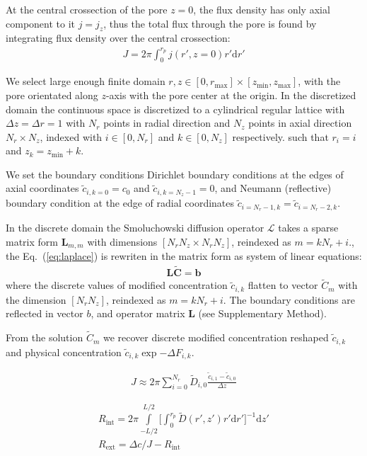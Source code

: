 \documentclass[12pt, a4paper]{article}
\begin{document}
At the central crossection of the pore $z=0$, the flux density has only axial component to it $j=j_z$, thus the total flux through the pore is found by integrating flux density over the central crossection:
\begin{eqnarray}
    J = 2\pi\int_{0}^{r_p}j(r',z=0) r' \text{d}r'
\end{eqnarray}

We select large enough finite domain  $r,z \in [0, r_{\text{max}}] \times [z_{\text{min}}, z_{\text{max}}]$, with the pore orientated along $z$-axis with the pore center at the origin.
In the discretized domain the continuous space is discretized to a cylindrical regular lattice with $\Delta z = \Delta r = 1$ with $N_r$ points in radial direction and $N_z$ points in axial direction $N_r \times N_z$, indexed with $i \in [0, N_r]$ and $k \in [0, N_z]$ respectively.
such that $r_i = i$ and $z_k =  z_{\text{min}} + k$.

We set the boundary conditions Dirichlet boundary conditions at the edges of axial coordinates $\tilde{c}_{i,k=0} = c_0$ and $\tilde{c}_{i,k=N_z-1} = 0$, and Neumann (reflective) boundary condition at the edge of radial coordinates $\tilde{c}_{i=N_r-1,k} = \tilde{c}_{i=N_r-2,k}$.

In the discrete domain the Smoluchowski diffusion operator $\mathcal{L}$ takes a sparse matrix form $\mathbf{L}_{m,m}$ with dimensions $[N_r N_z \times N_r N_z]$, reindexed as $m = k N_r + i$., the Eq.~(\ref{eq:laplace}) is rewriten in the matrix form as system of linear equations:
\begin{eqnarray}
    \mathbf{L} \tilde{\bm{C}} = \bm{b}
    \label{eq:matrix_form}
\end{eqnarray}
where the discrete values of modified concentration $\tilde{c}_{i,k}$ flatten to vector $\tilde{C}_m$ with the dimension $[N_r N_z]$, reindexed as $m = k N_r + i$.
The boundary conditions are reflected in vector $b$, and operator matrix $\mathbf{L}$ (see Supplementary Method).

From the solution $\tilde{C}_m$ we recover discrete modified concentration reshaped $\tilde{c}_{i,k}$ and physical concentration $\tilde{c}_{i,k} \exp{-\Delta F_{i,k}}$.

\begin{eqnarray}
    J \approx 2 \pi \sum_{i=0}^{N_r} \tilde{D}_{i, 0} \frac{\tilde{c}_{i, 1} - \tilde{c}_{i, 0}}{\Delta z} 
\end{eqnarray}

\begin{eqnarray}
    R_{\text{int}} = 2 \pi \int\limits_{-L/2}^{L/2} \Bigg[\int_{0}^{r_p} \tilde{D}(r',z') r' \text{d}r' \Bigg]^{-1} \text{d}z'
    \\
    R_{\text{ext}} = \Delta c/J - R_{\text{int}}
\end{eqnarray}
\end{document}
